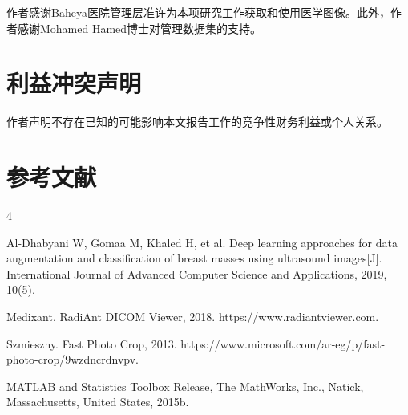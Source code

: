 \documentclass[supercite]{../Hust-undergraduate-translation/Experimental_Report}
\theoremstyle{definition}
\begin{document}
作者感谢Baheya医院管理层准许为本项研究工作获取和使用医学图像。此外，作者感谢Mohamed Hamed博士对管理数据集的支持。

\section{利益冲突声明}

作者声明不存在已知的可能影响本文报告工作的竞争性财务利益或个人关系。

\section{参考文献}

\begin{thebibliography}{4}

 Al-Dhabyani W, Gomaa M, Khaled H, et al. Deep learning approaches for data augmentation and classification of breast masses using ultrasound images[J]. International Journal of Advanced Computer Science and Applications, 2019, 10(5).

 Medixant. RadiAnt DICOM Viewer, 2018. https://www.radiantviewer.com.

 Szmieszny. Fast Photo Crop, 2013. https://www.microsoft.com/ar-eg/p/fast-photo-crop/9wzdncrdnvpv.

 MATLAB and Statistics Toolbox Release, The MathWorks, Inc., Natick, Massachusetts, United States, 2015b.

\end{thebibliography}
\end{document}

